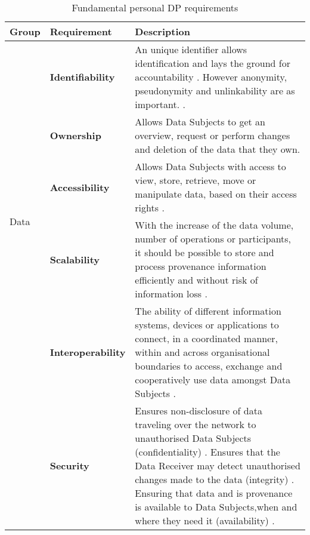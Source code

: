 \begin{table}[H]
    \centering

\caption{Fundamental personal DP requirements}
    \label{tab:dpreq}

\begin{tabular}{|m{4em}|m{6.3em}|m{11cm}|}

\hline
\hspace{4pt}\cellcolor{gray!15}\textbf{Group} & \cellcolor{gray!15}\textbf{Requirement} & \cellcolor{gray!15}\textbf{Description} \\
\hline
\hline
\multirow{5}{*}{\centerline{Data}} & \textbf{Identifiability}             & An unique identifier allows identification and lays the ground for accountability \cite{req_identification}. However anonymity, pseudonymity and unlinkability are as important. \cite{req_tets_logging_unlinkability_completeness,req_identification_anonymity}. \\ [0.3em]\cline{2-3}
\multirow{2}{*}{\centerline{Subject}}     & \textbf{Ownership}                  & Allows Data Subjects to get an overview, request or perform changes and deletion of the data that they own. \cite{req_ownership_access_transparency}\\ [12pt]\cline{2-3}
                          & \textbf{Accessibility}              & Allows Data Subjects with access to view, store, retrieve, move or manipulate data, based on their access rights \cite{req_ownership_access_transparency, bier2016privacyinsight}. \\ [12pt]\hline\hline
\multirow{22}{*}{\centerline{System}}  & \textbf{Scalability}                & With the increase of the data volume, number of operations or participants, it should be possible to store and process provenance information efficiently and without risk of information loss \cite[p.~16]{req_scalability,req_traceability13_scalability16_usability17}. \\ [0.3em]\cline{2-3}
                          & \textbf{Interoperability}           &  The ability of different information systems, devices or applications to connect, in a coordinated manner, within and across organisational boundaries to access, exchange and cooperatively use data amongst Data Subjects \cite[IntOp]{req_interoperatbility}. \\ [0.3em]\cline{2-3} 
                          & \textbf{Security}            & Ensures non-disclosure of data traveling over the network to unauthorised Data Subjects (confidentiality) \cite{req_confidentiality}. Ensures that the Data Receiver may detect unauthorised changes made to the data (integrity) \cite{req_integrity}. Ensuring that data and is provenance is available to Data Subjects,when and where they need it (availability) \cite{req_availability}. \\  [0.3em]\cline{2-3} 

\end{tabular}
\end{table}
